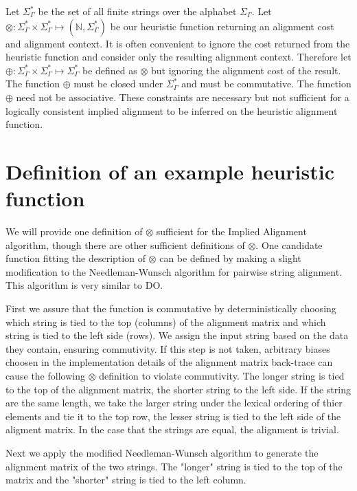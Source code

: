 \documentclass[11pt]{article}
\begin{document}
Let $\Sigma^{*}_{\Gamma}$ be the set of all finite strings over the alphabet $\Sigma_{\Gamma}$.
Let $\otimes \colon \Sigma^{*}_{\Gamma} \times \Sigma^{*}_{\Gamma} \mapsto \left(\mathbb{N}, \Sigma^{*}_{\Gamma}\right)$ be our heuristic function returning an alignment cost and alignment context.
It is often convenient to ignore the cost returned from the heuristic function and consider only the resulting alignment context. Therefore let $\oplus \colon \Sigma^{*}_{\Gamma} \times \Sigma^{*}_{\Gamma} \mapsto \Sigma^{*}_{\Gamma}$ be defined as $\otimes$ but ignoring the alignment cost of the result. 
The function $\oplus$ must be closed under $\Sigma^{*}_{\Gamma}$ and must be commutative. 
The function $\oplus$ need not be associative.
These constraints are necessary but not sufficient for a logically consistent implied alignment to be inferred on the heuristic alignment function.

\section{Definition of an example heuristic function}
We will provide one definition of $\otimes$ sufficient for the Implied Alignment algorithm, though there are other sufficient definitions of $\otimes$. 
One candidate function fitting the description of $\otimes$ can be defined by making a slight modification to the Needleman-Wunsch \cite{Needleman1970} algorithm for pairwise string alignment.
This algorithm is very similar to DO.

First we assure that the function is commutative by deterministically choosing which string is tied to the top (columns) of the alignment matrix and which string is tied to the left side (rows). 
We assign the input string based on the data they contain, ensuring commutivity. If this step is not taken, arbitrary biases choosen in the implementation details of the alignment matrix back-trace can cause the following $\otimes$ definition to violate commutivity. 
The longer string is tied to the top of the alignment matrix, the shorter string to the left side. If the string are the same length, we take the larger string under the lexical ordering of thier elements and tie it to the top row, the lesser string is tied to the left side of the aligment matrix. 
In the case that the strings are equal, the alignment is trivial.

Next we apply the modified Needleman-Wunsch algorithm to generate the alignment matrix of the two strings. The "longer" string is tied to the top of the matrix and the "shorter" string is tied to the left column.
\end{document}
